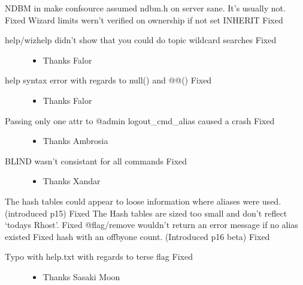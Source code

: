 \documentclass[letterpaper,10pt,english]{sphinxmanual}
\begin{document}
\sphinxAtStartPar
NDBM in make confsource assumed ndbm.h on server sane.  It’s usually not. \sphinxhyphen{} Fixed
Wizard limits wern’t verified on ownership if not set INHERIT \sphinxhyphen{} Fixed
\begin{description}
\item[{help/wizhelp didn’t show that you could do topic wildcard searches \sphinxhyphen{} Fixed}] \leavevmode\begin{itemize}
\item {} 
\sphinxAtStartPar
Thanks Falor

\end{itemize}

\item[{help syntax error with regards to null() and @@() \sphinxhyphen{} Fixed}] \leavevmode\begin{itemize}
\item {} 
\sphinxAtStartPar
Thanks Falor

\end{itemize}

\item[{Passing only one attr to @admin logout\_cmd\_alias caused a crash \sphinxhyphen{} Fixed}] \leavevmode\begin{itemize}
\item {} 
\sphinxAtStartPar
Thanks Ambrosia

\end{itemize}

\item[{BLIND wasn’t consistant for all commands \sphinxhyphen{} Fixed}] \leavevmode\begin{itemize}
\item {} 
\sphinxAtStartPar
Thanks Xandar

\end{itemize}

\end{description}

\sphinxAtStartPar
The hash tables could appear to loose information where aliases were used.  (introduced p15) \sphinxhyphen{} Fixed
The Hash tables are sized too small and don’t reflect ‘todays Rhost’.  \sphinxhyphen{} Fixed
@flag/remove wouldn’t return an error message if no alias existed \sphinxhyphen{} Fixed
hash with an off\sphinxhyphen{}by\sphinxhyphen{}one count. (Introduced p16 beta) \sphinxhyphen{} Fixed
\begin{description}
\item[{Typo with help.txt with regards to terse flag \sphinxhyphen{} Fixed}] \leavevmode\begin{itemize}
\item {} 
\sphinxAtStartPar
Thanks Sasaki  Moon

\end{itemize}

\end{description}
\end{document}
